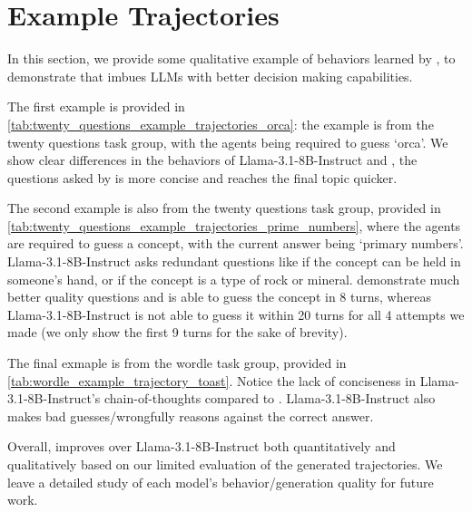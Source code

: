 \section{Example Trajectories} \label{appendixSection:example_trajectories}

In this section, we provide some qualitative example of behaviors learned by \ours{}, to demonstrate that \ours{} imbues LLMs with better decision making capabilities. 

The first example is provided in \cref{tab:twenty_questions_example_trajectories_orca}: the example is from the twenty questions task group, with the agents being required to guess `orca'. We show clear differences in the behaviors of Llama-3.1-8B-Instruct and \ours{}, the questions asked by \ours{} is more concise and reaches the final topic quicker. 

The second example is also from the twenty questions task group, provided in \cref{tab:twenty_questions_example_trajectories_prime_numbers}, where the agents are required to guess a concept, with the current answer being `primary numbers'. Llama-3.1-8B-Instruct asks redundant questions like if the concept can be held in someone's hand, or if the concept is a type of rock or mineral. \ours{} demonstrate much better quality questions and is able to guess the concept in 8 turns, whereas Llama-3.1-8B-Instruct is not able to guess it within 20 turns for all 4 attempts we made (we only show the first 9 turns for the sake of brevity).

The final exmaple is from the wordle task group, provided in \cref{tab:wordle_example_trajectory_toast}. Notice the lack of conciseness in Llama-3.1-8B-Instruct's chain-of-thoughts compared to \ours{}. Llama-3.1-8B-Instruct also makes bad guesses/wrongfully reasons against the correct answer. 

Overall, \ours{} improves over Llama-3.1-8B-Instruct both quantitatively and qualitatively based on our limited evaluation of the generated trajectories. We leave a detailed study of each model's behavior/generation quality for future work.

\newpage

